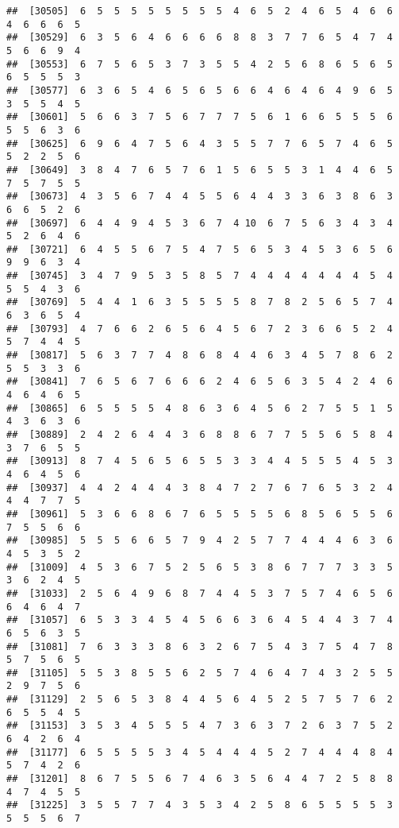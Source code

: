 \documentclass[
]{book}
\begin{document}
\begin{verbatim}
##  [30505]  6  5  5  5  5  5  5  5  5  4  6  5  2  4  6  5  4  6  6  4  6  6  6  5
##  [30529]  6  3  5  6  4  6  6  6  6  8  8  3  7  7  6  5  4  7  4  5  6  6  9  4
##  [30553]  6  7  5  6  5  3  7  3  5  5  4  2  5  6  8  6  5  6  5  6  5  5  5  3
##  [30577]  6  3  6  5  4  6  5  6  5  6  6  4  6  4  6  4  9  6  5  3  5  5  4  5
##  [30601]  5  6  6  3  7  5  6  7  7  7  5  6  1  6  6  5  5  5  6  5  5  6  3  6
##  [30625]  6  9  6  4  7  5  6  4  3  5  5  7  7  6  5  7  4  6  5  5  2  2  5  6
##  [30649]  3  8  4  7  6  5  7  6  1  5  6  5  5  3  1  4  4  6  5  7  5  7  5  5
##  [30673]  4  3  5  6  7  4  4  5  5  6  4  4  3  3  6  3  8  6  3  6  6  5  2  6
##  [30697]  6  4  4  9  4  5  3  6  7  4 10  6  7  5  6  3  4  3  4  5  2  6  4  6
##  [30721]  6  4  5  5  6  7  5  4  7  5  6  5  3  4  5  3  6  5  6  9  9  6  3  4
##  [30745]  3  4  7  9  5  3  5  8  5  7  4  4  4  4  4  4  4  5  4  5  5  4  3  6
##  [30769]  5  4  4  1  6  3  5  5  5  5  8  7  8  2  5  6  5  7  4  6  3  6  5  4
##  [30793]  4  7  6  6  2  6  5  6  4  5  6  7  2  3  6  6  5  2  4  5  7  4  4  5
##  [30817]  5  6  3  7  7  4  8  6  8  4  4  6  3  4  5  7  8  6  2  5  5  3  3  6
##  [30841]  7  6  5  6  7  6  6  6  2  4  6  5  6  3  5  4  2  4  6  4  6  4  6  5
##  [30865]  6  5  5  5  5  4  8  6  3  6  4  5  6  2  7  5  5  1  5  4  3  6  3  6
##  [30889]  2  4  2  6  4  4  3  6  8  8  6  7  7  5  5  6  5  8  4  3  7  6  5  5
##  [30913]  8  7  4  5  6  5  6  5  5  3  3  4  4  5  5  5  4  5  3  4  6  4  5  6
##  [30937]  4  4  2  4  4  4  3  8  4  7  2  7  6  7  6  5  3  2  4  4  4  7  7  5
##  [30961]  5  3  6  6  8  6  7  6  5  5  5  5  6  8  5  6  5  5  6  7  5  5  6  6
##  [30985]  5  5  5  6  6  5  7  9  4  2  5  7  7  4  4  4  6  3  6  4  5  3  5  2
##  [31009]  4  5  3  6  7  5  2  5  6  5  3  8  6  7  7  7  3  3  5  3  6  2  4  5
##  [31033]  2  5  6  4  9  6  8  7  4  4  5  3  7  5  7  4  6  5  6  6  4  6  4  7
##  [31057]  6  5  3  3  4  5  4  5  6  6  3  6  4  5  4  4  3  7  4  6  5  6  3  5
##  [31081]  7  6  3  3  3  8  6  3  2  6  7  5  4  3  7  5  4  7  8  5  7  5  6  5
##  [31105]  5  5  3  8  5  5  6  2  5  7  4  6  4  7  4  3  2  5  5  2  9  7  5  6
##  [31129]  2  5  6  5  3  8  4  4  5  6  4  5  2  5  7  5  7  6  2  6  5  5  4  5
##  [31153]  3  5  3  4  5  5  5  4  7  3  6  3  7  2  6  3  7  5  2  6  4  2  6  4
##  [31177]  6  5  5  5  5  3  4  5  4  4  4  5  2  7  4  4  4  8  4  5  7  4  2  6
##  [31201]  8  6  7  5  5  6  7  4  6  3  5  6  4  4  7  2  5  8  8  4  7  4  5  5
##  [31225]  3  5  5  7  7  4  3  5  3  4  2  5  8  6  5  5  5  5  3  5  5  5  6  7

\end{verbatim}
\end{document}
